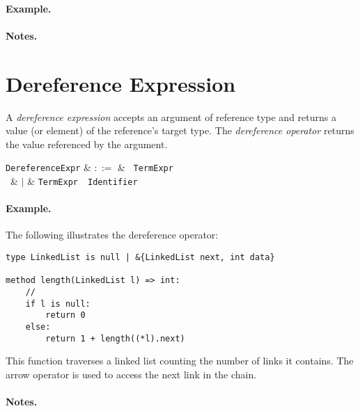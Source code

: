 \paragraph{Example.}

\paragraph{Notes.}


\section{Dereference Expression}
\label{c_expr_dereference}

A {\em dereference expression} accepts an argument of reference type and returns a value (or element) of the reference's target type.  The {\em dereference operator} returns the value referenced by the argument.  

\begin{syntax}
  \verb+DereferenceExpr+ & $::=$ & \token{*}\ \verb+TermExpr+\\\
  & $|$ & \verb+TermExpr+\ \token{->}\ \verb+Identifier+\\
\end{syntax}

\paragraph{Example.} The following illustrates the dereference operator:

\begin{lstlisting}
type LinkedList is null | &{LinkedList next, int data}

method length(LinkedList l) => int:
    //
    if l is null:
        return 0
    else:
        return 1 + length((*l).next)
\end{lstlisting}

This function traverses a linked list counting the number of links it contains.  The arrow operator is used to access the next link in the chain.

\paragraph{Notes.}


